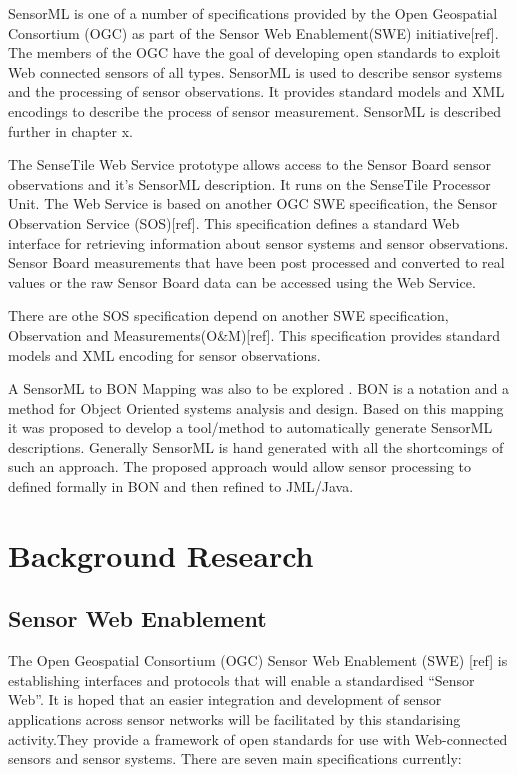 \documentclass[]{final_report}
\begin{document}
SensorML is one of a number of specifications provided by the Open Geospatial Consortium (OGC) as part of the Sensor Web Enablement(SWE) initiative[ref]. The members of the OGC have the goal of developing open standards to exploit Web connected sensors of all types. SensorML is used to describe sensor systems and the processing of sensor observations. It provides standard models and XML encodings to describe the process of sensor measurement. SensorML is described further in chapter x.

The SenseTile Web Service prototype allows access to the Sensor Board sensor observations and it's SensorML description. It runs on the SenseTile Processor Unit.  The Web Service is based on another OGC SWE  specification, the Sensor Observation Service (SOS)[ref]. This specification defines a standard Web interface for retrieving information about sensor systems and sensor observations. Sensor Board measurements that have been post processed and converted to real values or the raw Sensor Board data can be accessed using the Web Service.

There are othe  SOS specification depend on another SWE specification, Observation and Measurements(O\&M)[ref]. This specification provides standard models and XML encoding for sensor observations.

A  SensorML to BON Mapping was also to be explored . BON\cite{BONref} is a notation and a method for Object Oriented systems analysis and design. Based on this mapping it was proposed to develop a tool/method to automatically generate SensorML descriptions. Generally SensorML is hand generated with all the shortcomings of such an approach. The proposed approach would allow sensor processing to defined formally in BON and then refined to JML/Java. 


\chapter{ Background Research}


\section{Sensor Web Enablement}
The Open Geospatial Consortium (OGC) Sensor Web Enablement (SWE) [ref]  is establishing interfaces and protocols that will enable a standardised “Sensor Web”. It is hoped that an easier integration and development of sensor applications across sensor networks will be facilitated by this standarising activity.They provide a framework of open standards for use with Web-connected sensors and sensor systems. There are seven main specifications currently:
\end{document}
